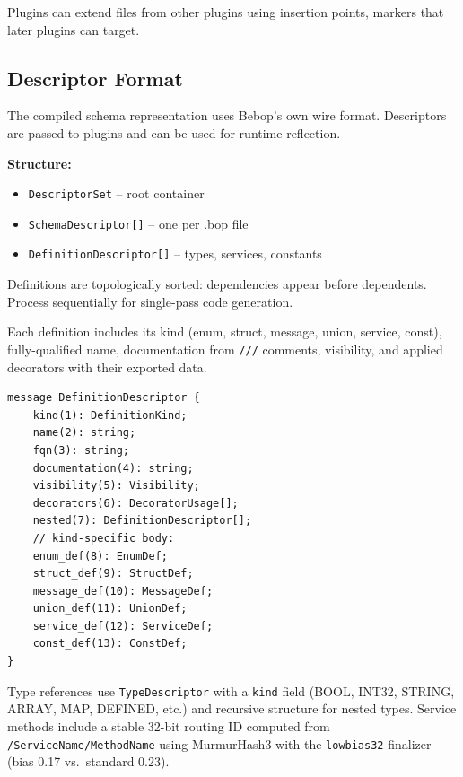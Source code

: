 \documentclass[11pt,onecolumn]{article}
\begin{document}
Plugins can extend files from other plugins using insertion points, markers that later plugins can target.

\subsection{Descriptor Format}

The compiled schema representation uses Bebop's own wire format. Descriptors are passed to plugins and can be used for runtime reflection.

\begin{minipage}{\textwidth}
\begin{minipage}[t]{0.52\textwidth}
\raggedright
\textbf{Structure:}
\begin{itemize}[leftmargin=1.2em,itemsep=1pt,topsep=2pt]
\item \texttt{DescriptorSet} -- root container
\item \texttt{SchemaDescriptor[]} -- one per .bop file
\item \texttt{DefinitionDescriptor[]} -- types, services, constants
\end{itemize}

Definitions are topologically sorted: dependencies appear before dependents. Process sequentially for single-pass code generation.

Each definition includes its kind (enum, struct, message, union, service, const), fully-qualified name, documentation from \texttt{///} comments, visibility, and applied decorators with their exported data.
\end{minipage}\hfill
\begin{minipage}[t]{0.44\textwidth}
\begin{lstlisting}[language=bebop,aboveskip=0pt,belowskip=0pt]
message DefinitionDescriptor {
    kind(1): DefinitionKind;
    name(2): string;
    fqn(3): string;
    documentation(4): string;
    visibility(5): Visibility;
    decorators(6): DecoratorUsage[];
    nested(7): DefinitionDescriptor[];
    // kind-specific body:
    enum_def(8): EnumDef;
    struct_def(9): StructDef;
    message_def(10): MessageDef;
    union_def(11): UnionDef;
    service_def(12): ServiceDef;
    const_def(13): ConstDef;
}
\end{lstlisting}
\end{minipage}
\end{minipage}

Type references use \texttt{TypeDescriptor} with a \texttt{kind} field (BOOL, INT32, STRING, ARRAY, MAP, DEFINED, etc.) and recursive structure for nested types. Service methods include a stable 32-bit routing ID computed from \texttt{/ServiceName/MethodName} using MurmurHash3 with the \texttt{lowbias32} finalizer~\cite{hashprospector} (bias 0.17 vs.\ standard 0.23).
\end{document}
